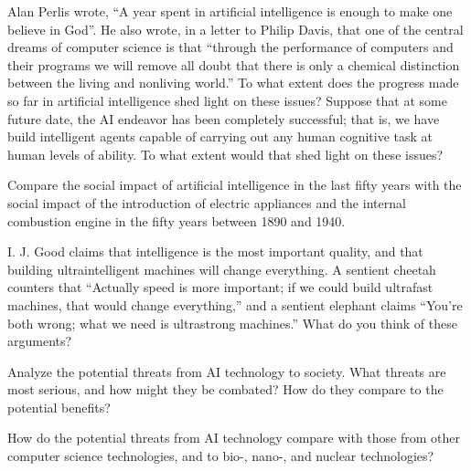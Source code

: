 \begin{exercise}
Alan Perlis \citeyear{Perlis:1982} wrote, ``A year spent in artificial intelligence is enough 
to make one believe in God''.  He also wrote, in a letter to Philip Davis, that one of
the central dreams of computer science is that ``through the performance
of computers and their programs we will remove all doubt that there is only
a chemical distinction between the living and nonliving world.''
To what extent does the progress made so far in artificial intelligence 
shed light on these issues?  Suppose that at some future date, the AI endeavor
has been completely successful; that is, we have build intelligent agents
capable of carrying out any human cognitive task at human levels of ability.
To what extent would that shed light on these issues?
\end{exercise} 



\begin{exercise}
  Compare the social impact of artificial intelligence in the last fifty years
with the social impact of the introduction of electric appliances and the
internal combustion engine in the fifty years between 1890 and 1940. 
\end{exercise} 

\begin{exercise}
  I. J. Good claims that intelligence is the most important quality, and that
  building ultraintelligent machines will change everything. A sentient cheetah
  counters that ``Actually speed is more important; if we could build ultrafast machines,
  that would change everything,'' and a sentient elephant claims ``You're both wrong;
  what we need is ultrastrong machines.'' What do you think of these arguments?
\end{exercise} 

\begin{exercise}
Analyze the potential threats from AI technology to society.  What threats
are most serious, and how might they be combated?  How do they compare to
the potential benefits?
\end{exercise} 

\begin{exercise}
How do the potential threats from AI technology compare with those from other computer
science technologies, and to bio-, nano-, and nuclear technologies?
\end{exercise} 

